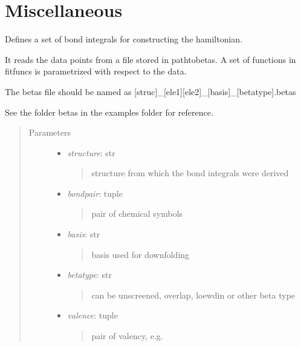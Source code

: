 \documentclass[letterpaper,10pt,english]{sphinxmanual}
\begin{document}
\section{Miscellaneous}
\label{classes:module-beta}\label{classes:miscellaneous}

\begin{fulllineitems}
Defines a set of bond integrals for constructing the hamiltonian.

It reads the data points from a file stored in pathtobetas. 
A set of functions in fitfuncs is parametrized with respect to the data.

The betas file should be named as 
{[}struc{]}\_{[}ele1{]}{[}ele2{]}\_{[}basis{]}\_{[}betatype{]}.betas

See the folder betas in the examples folder for reference.
\begin{quote}\begin{description}
\item[{Parameters}] \leavevmode\begin{itemize}
\item {} 
\emph{structure}: str
\begin{quote}

structure from which the bond integrals were derived
\end{quote}

\item {} 
\emph{bondpair}: tuple
\begin{quote}

pair of chemical symbols
\end{quote}

\item {} 
\emph{basis}: str
\begin{quote}

basis used for downfolding
\end{quote}

\item {} 
\emph{betatype}: str
\begin{quote}

can be unscreened, overlap, loewdin or other beta type
\end{quote}

\item {} 
\emph{valence}: tuple
\begin{quote}

pair of valency, e.g. 
\end{quote}


\end{itemize}
\end{description}
\end{quote}
\end{fulllineitems}
\end{document}
